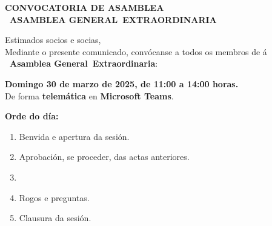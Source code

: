 \documentclass[a4paper,12pt]{article}
\newcommand{\assemblyType}{Extraordinaria}
\newcommand{\assemblyDate}{Domingo 30 de marzo de 2025, de 11:00 a 14:00 horas.}
\newcommand{\assemblyPresence}{telemática}
\newcommand{\assemblyUbication}{Microsoft Teams}
\newcommand{\headerSubject}{CONVOCATORIA DE ASAMBLEA}
\newcommand{\assemblyNumber}{1} %
\newcommand{\assemblyName}{\Romannum{\assemblyNumber}~Asamblea General~\assemblyType}
\newcommand{\subject}{\headerSubject \\ \MakeUppercase{\assemblyName}}
\begin{document}
\begin{center}
    \large \textbf{\subject}
\end{center}

Estimados socios e socias, \\

Mediante o presente comunicado, convócanse a todos os membros de \textbf{\nombreAsociacion} á \textbf{\assemblyName}:

\begin{center}
    \textbf{\assemblyDate}\\
    De forma \textbf{\assemblyPresence} en \textbf{\assemblyUbication}.
\end{center}

\textbf{Orde do día:}
\begin{enumerate}
    \item Benvida e apertura da sesión.
    \item Aprobación, se proceder, das actas anteriores.
    \item
    \item Rogos e preguntas.
    \item Clausura da sesión.
\end{enumerate}

\firma
\end{document}
